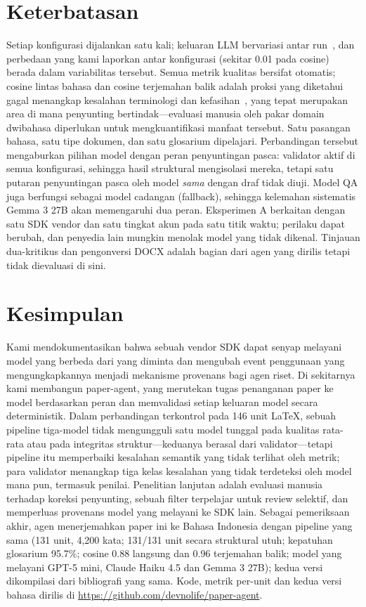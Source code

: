 \section{Keterbatasan}
\label{sec:limits}
Setiap konfigurasi dijalankan satu kali; keluaran LLM bervariasi antar run~\cite{arya2026wizard}, dan perbedaan yang kami laporkan antar konfigurasi (sekitar 0.01 pada cosine) berada dalam variabilitas tersebut. Semua metrik kualitas bersifat otomatis; cosine lintas bahasa dan cosine terjemahan balik adalah proksi yang diketahui gagal menangkap kesalahan terminologi dan kefasihan~\cite{freitag2021mqm,moon2020roundtrip}, yang tepat merupakan area di mana penyunting bertindak---evaluasi manusia oleh pakar domain dwibahasa diperlukan untuk mengkuantifikasi manfaat tersebut. Satu pasangan bahasa, satu tipe dokumen, dan satu glosarium dipelajari. Perbandingan tersebut mengaburkan pilihan model dengan peran penyuntingan pasca: validator aktif di semua konfigurasi, sehingga hasil struktural mengisolasi mereka, tetapi satu putaran penyuntingan pasca oleh model \emph{sama} dengan draf tidak diuji. Model QA juga berfungsi sebagai model cadangan (fallback), sehingga kelemahan sistematis Gemma 3 27B akan memengaruhi dua peran. Eksperimen A berkaitan dengan satu SDK vendor dan satu tingkat akun pada satu titik waktu; perilaku dapat berubah, dan penyedia lain mungkin menolak model yang tidak dikenal. Tinjauan dua-kritikus dan pengonversi DOCX adalah bagian dari agen yang dirilis tetapi tidak dievaluasi di sini.

\section{Kesimpulan}
\label{sec:conclusion}
Kami mendokumentasikan bahwa sebuah vendor SDK dapat senyap melayani model yang berbeda dari yang diminta dan mengubah event penggunaan yang mengungkapkannya menjadi mekanisme provenans bagi agen riset. Di sekitarnya kami membangun paper-agent, yang merutekan tugas penanganan paper ke model berdasarkan peran dan memvalidasi setiap keluaran model secara deterministik. Dalam perbandingan terkontrol pada 146 unit LaTeX, sebuah pipeline tiga-model tidak mengungguli satu model tunggal pada kualitas rata-rata atau pada integritas struktur---keduanya berasal dari validator---tetapi pipeline itu memperbaiki kesalahan semantik yang tidak terlihat oleh metrik; para validator menangkap tiga kelas kesalahan yang tidak terdeteksi oleh model mana pun, termasuk penilai. Penelitian lanjutan adalah evaluasi manusia terhadap koreksi penyunting, sebuah filter terpelajar untuk review selektif, dan memperluas provenans model yang melayani ke SDK lain. Sebagai pemeriksaan akhir, agen menerjemahkan paper ini ke Bahasa Indonesia dengan pipeline yang sama (131 unit, 4{,}200 kata; 131/131 unit secara struktural utuh; kepatuhan glosarium 95.7\%; cosine 0.88 langsung dan 0.96 terjemahan balik; model yang melayani GPT-5 mini, Claude Haiku 4.5 dan Gemma 3 27B); kedua versi dikompilasi dari bibliografi yang sama. Kode, metrik per-unit dan kedua versi bahasa dirilis di \url{https://github.com/devnolife/paper-agent}.
